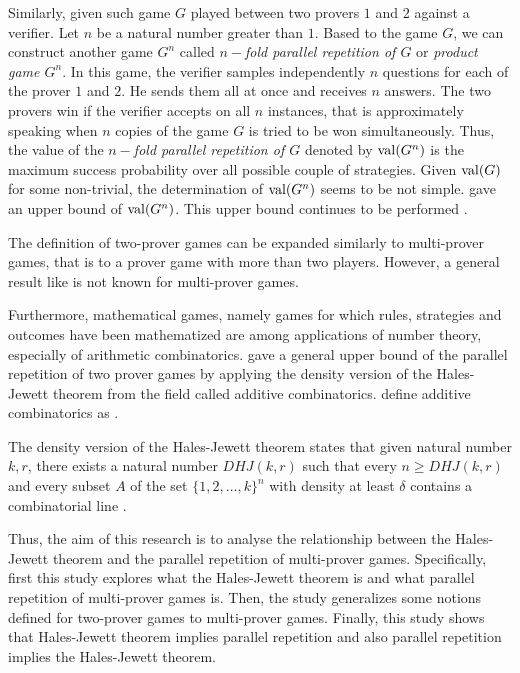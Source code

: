 Similarly, given such game $G$ played between two provers $1$ and $2$ against a verifier. Let $n$ be a natural number greater than $1.$ Based to the game $G$, we can construct another game $G^n$ called $n-$\textit{fold parallel repetition of $G$} or \textit{product game $G^n$}. In this game, the verifier samples independently $n$ questions for each of the prover $1$ and $2.$ He sends them all at once and receives $n$ answers. The two provers win if the verifier accepts on all $n$ instances, that is approximately speaking when $n$ copies of the game $G$ is tried to be won simultaneously. Thus, the value of the $n-$\textit{fold parallel repetition of $G$} denoted by $\mathrm{val} (G^n)$ is the maximum success probability over all possible couple of strategies. Given $\mathrm{val} (G)$ for some non-trivial, the determination of $\mathrm{val} (G^n)$ seems to be not simple. \cite{raz1998parallel} gave an upper bound of $\mathrm{val} (G^n)$. This upper bound  continues to be performed \citep{holenstein2007parallel, raz2012strong, dinur2014analytical, dinur2016multiplayer}.

The definition of two-prover games can be expanded similarly to multi-prover games, that is to a prover game with more than two players. However, a general result like \cite{raz1998parallel} is not known for multi-prover games. 

Furthermore, mathematical games, namely games for which rules, strategies and outcomes have been mathematized are among applications of number theory, especially of arithmetic combinatorics. \cite{verbitsky1996towards} gave a general  upper bound of the parallel repetition of  two prover games by applying the density version of the Hales-Jewett theorem from the field called additive combinatorics. \cite*{taoadditive} define additive combinatorics  as  .

The density version of the Hales-Jewett theorem states that given natural number $k,r$, there exists a natural number $DHJ(k,r)$ such that every $n\geq DHJ(k,r)$ and every subset $A$ of the set $\{1,2,\ldots,k\}^n$ with density at least $\delta$  contains a  combinatorial line  \citep{polymath2012new}.

Thus, the aim of this research is to analyse the relationship between the Hales-Jewett theorem and the parallel repetition of multi-prover games. Specifically, first  this study explores what  the Hales-Jewett theorem is and what  parallel repetition of multi-prover games is. Then, the study  generalizes some notions defined for two-prover games to multi-prover games.  Finally, this study shows that Hales-Jewett theorem implies parallel repetition and also parallel repetition implies the Hales-Jewett theorem.

